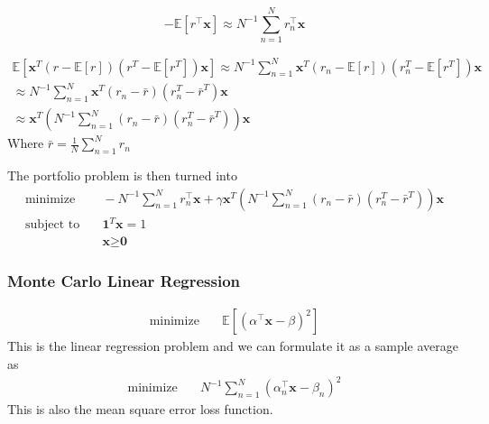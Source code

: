 \begin{equation}
  -\mathbb{E}[r^\top \textbf{x}] \approx N^{-1}\sum_{n=1}^N r_n^\top \textbf{x}
\end{equation}

\begin{equation}
  \begin{aligned}
    \mathbb{E}[\textbf{x}^T(r-\mathbb{E}[r])(r^T -\mathbb{E}[r^T])\textbf{x}] \approx  N^{-1} \sum_{n=1}^N \textbf{x}^T(r_n-\mathbb{E}[r])(r_n^T -\mathbb{E}[r^T])\textbf{x} \\
    \approx N^{-1} \sum_{n=1}^N \textbf{x}^T(r_n-\bar{r})(r_n^T -\bar{r}^T)\textbf{x} \\ 
    \approx \textbf{x}^T(N^{-1}\sum_{n=1}^N (r_n-\bar{r})(r_n^T -\bar{r}^T))\textbf{x}
  \end{aligned}
\end{equation}
Where $\bar{r} = \frac{1}{N} \sum_{n=1}^{N} r_n$

The portfolio problem is then turned into 
\begin{align}
  \text{minimize} & \quad -N^{-1}\sum_{n=1}^N r_n^\top \textbf{x} + \gamma \textbf{x}^T(N^{-1}\sum_{n=1}^N (r_n-\bar{r})(r_n^T -\bar{r}^T))\textbf{x} \\
  \text{subject to} & \quad \textbf{1}^T \textbf{x} = 1 \\
  & \quad \textbf{x} \geq \textbf{0}
\end{align}

\subsubsection{Monte Carlo Linear Regression}
\begin{align}
  \text{minimize} & \quad \mathbb{E}[(\alpha^\top \textbf{x} - \beta)^2]
\end{align}
This is the linear regression problem and we can formulate it as a sample average as
\begin{align}
  \text{minimize} & \quad N^{-1}\sum_{n=1}^{N}(\alpha_n^\top \textbf{x} - \beta_n)^2
\end{align}
This is also the mean square error loss function.

